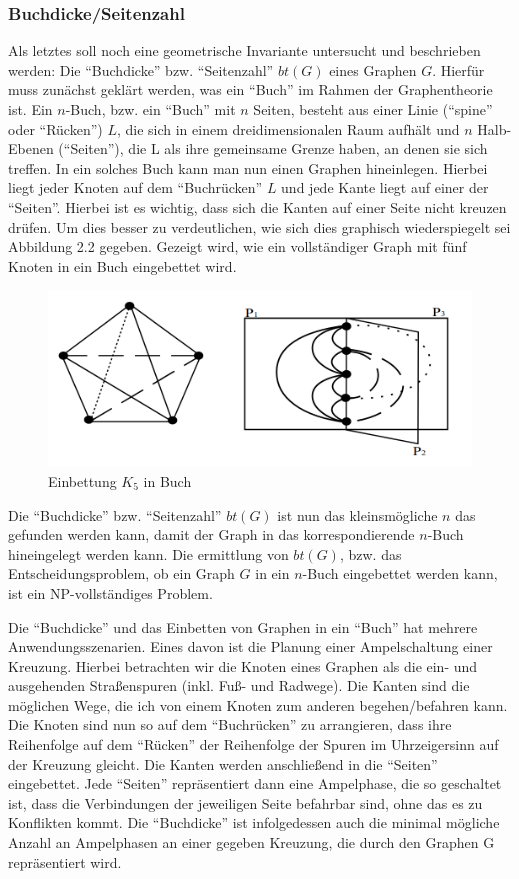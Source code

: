 \documentclass[a4paper,12pt,ngerman,chapterprefix=false,listof=totoc,bibliography=totoc]{scrreprt}
\begin{document}
{\subsubsection*{Buchdicke/Seitenzahl}
{
Als letztes soll noch eine geometrische Invariante untersucht und beschrieben werden: Die "`Buchdicke"' bzw. "`Seitenzahl"' \(bt(G)\) eines Graphen \(G\). Hierfür muss zunächst geklärt werden, was ein "`Buch"' im Rahmen der Graphentheorie ist. Ein \(n\)-Buch, bzw. ein "`Buch"' mit \(n\) Seiten, besteht aus einer Linie ("`spine"' oder "`Rücken"') \(L\), die sich in einem dreidimensionalen Raum aufhält und \(n\) Halb-Ebenen ("`Seiten"'), die L als ihre gemeinsame Grenze haben, an denen sie sich treffen. In ein solches Buch kann man nun einen Graphen hineinlegen. Hierbei liegt jeder Knoten auf dem "`Buchrücken"' \(L\) und jede Kante liegt auf einer der "`Seiten"'. Hierbei ist es wichtig, dass sich die Kanten auf einer Seite nicht kreuzen drüfen. Um dies besser zu verdeutlichen, wie sich dies graphisch wiederspiegelt sei Abbildung 2.2 gegeben. Gezeigt wird, wie ein vollständiger Graph mit fünf Knoten in ein Buch eingebettet wird.
\begin{figure}[ht!]
	\centering
	\includegraphics[scale=0.4]{Abbildungen/graph_book.png}
	\caption[Einbettung \(K_5\) in Buch \cite{blankenship_book_2003}]{Einbettung \(K_5\) in Buch \cite{blankenship_book_2003}}
\end{figure}
Die "`Buchdicke"' bzw. "`Seitenzahl"' \(bt(G)\) ist nun das kleinsmögliche \(n\) das gefunden werden kann, damit der Graph in das korrespondierende \(n\)-Buch hineingelegt werden kann. \cite{bernhart_book_1979} Die ermittlung von \(bt(G)\), bzw. das Entscheidungsproblem, ob ein Graph \(G\) in ein \(n\)-Buch eingebettet werden kann, ist ein NP-vollständiges Problem. \cite{chung_embedding_1987}

Die "`Buchdicke"' und das Einbetten von Graphen in ein "`Buch"' hat mehrere Anwendungsszenarien. Eines davon ist die Planung einer Ampelschaltung einer Kreuzung. Hierbei betrachten wir die Knoten eines Graphen als die ein- und ausgehenden Straßenspuren (inkl. Fuß- und Radwege). Die Kanten sind die möglichen Wege, die ich von einem Knoten zum anderen begehen/befahren kann. Die Knoten sind nun so auf dem "`Buchrücken"' zu arrangieren, dass ihre Reihenfolge auf dem "`Rücken"' der Reihenfolge der Spuren im Uhrzeigersinn auf der Kreuzung gleicht. Die Kanten werden anschließend in die "`Seiten"' eingebettet. Jede "`Seiten"' repräsentiert dann eine Ampelphase, die so geschaltet ist, dass die Verbindungen der jeweiligen Seite befahrbar sind, ohne das es zu Konflikten kommt. Die "`Buchdicke"' ist infolgedessen auch die minimal mögliche Anzahl an Ampelphasen an einer gegeben Kreuzung, die durch den Graphen G repräsentiert wird. \cite{kainen_book_1990}
}
}
\end{document}
